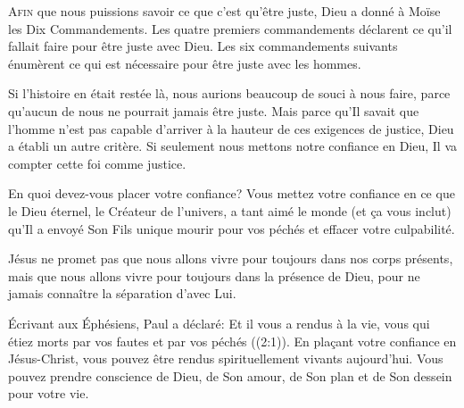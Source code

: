 



\lettrine{A}{fin} que nous puissions savoir ce que c'est qu'être juste,
 Dieu a donné à Moïse les Dix Commandements.
 Les quatre premiers commandements déclarent ce qu'il fallait faire
 pour être juste avec Dieu.
 Les six commandements suivants énumèrent ce qui est nécessaire
 pour être juste avec les hommes. 

Si l'histoire en était restée là, nous aurions beaucoup de souci à nous faire,
 parce qu'aucun de nous ne pourrait jamais être juste.
 Mais parce qu'Il savait que l'homme n'est pas capable d'arriver
 à la hauteur de ces exigences de justice, Dieu a établi un autre critère.
 Si seulement nous mettons notre confiance en Dieu,
 Il va compter cette foi comme justice. 

En quoi devez-vous placer votre confiance?
 Vous mettez votre confiance en ce que le Dieu éternel,
 le Créateur de l'univers, a tant aimé le monde (et \c{c}a vous inclut)
 qu'Il a envoyé Son Fils unique mourir pour vos péchés
 et effacer votre culpabilité. 


Jésus ne promet pas que nous allons vivre pour toujours
 dans nos corps présents, mais que nous allons vivre pour toujours
 dans la présence de Dieu, 
 pour ne jamais connaître la séparation d'avec Lui. 

Écrivant aux Éphésiens, Paul a déclaré:
 \Og Et il vous a rendus à la vie, vous qui étiez morts par vos fautes
 et par vos péchés \Fg{} ((2:1)).
 En pla\c{c}ant votre confiance en Jésus-Christ, vous pouvez être rendus
 spirituellement vivants aujourd'hui.
 Vous pouvez prendre conscience de Dieu, de Son amour, de Son plan
 et de Son dessein pour votre vie. 

\dvrule



